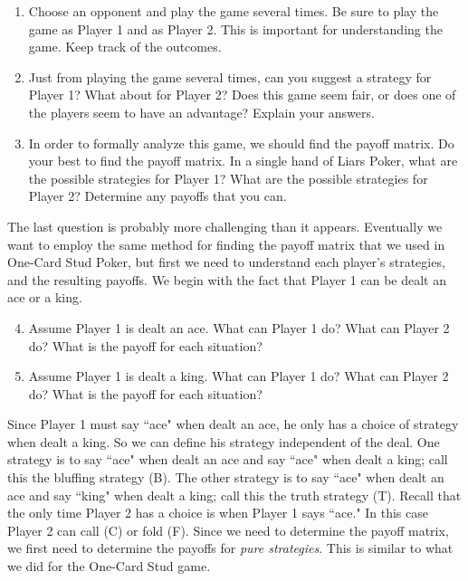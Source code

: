 \begin{enumerate}
\item Choose an opponent and play the game several times. Be sure to play the game as Player 1 and as Player 2. This is important for understanding the game. Keep track of the outcomes.
\smallskip

\item Just from playing the game several times, can you suggest a strategy for Player 1? What about for Player 2? Does this game seem fair, or does one of the players seem to have an advantage? Explain your answers.
\smallskip


\item In order to formally analyze this game, we should find the payoff matrix. Do your best to find the payoff matrix. In a single hand of Liars Poker, what are the possible strategies for Player 1? What are the possible strategies for Player 2? Determine any payoffs that you can.
\smallskip

\end{enumerate}
The last question is probably more challenging than it appears. Eventually we want to employ the same method for finding the payoff matrix that we used in One-Card Stud Poker, but first we need to understand each player's strategies, and the resulting payoffs.  We begin with the fact that Player 1 can be dealt an ace or a king. 

\begin{enumerate}
\setcounter{enumi}{3} 
\item Assume Player 1 is dealt an ace. What can Player 1 do? What can Player 2 do? What is the payoff for each situation?
\vspace{.1 in}

\item Assume Player 1 is dealt a king. What can Player 1 do? What can Player 2 do? What is the payoff for each situation?
\vspace{.1 in}

\end{enumerate}

Since Player 1 must say ``ace" when dealt an ace, he only has a choice of strategy when dealt a king. So we can define his strategy independent of the deal. One strategy is to say ``ace" when dealt an ace and say ``ace" when dealt a king; call this the bluffing strategy (B). The other strategy is to say ``ace" when dealt an ace and say ``king" when dealt a king; call this the truth strategy (T). Recall that the only time Player 2 has a choice is when Player 1 says ``ace." In this case Player 2 can call (C) or fold (F). Since we need to determine the payoff matrix, we first need to determine  the payoffs for {\it pure strategies}. This is similar to what we did for the One-Card Stud game.

